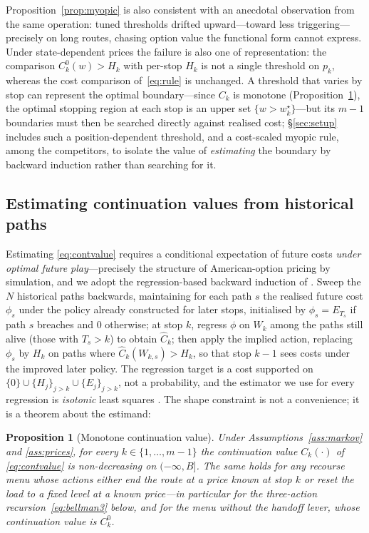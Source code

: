 \documentclass[preprint,authoryear,12pt]{elsarticle}
\newtheorem{proposition}[theorem]{Proposition}
\theoremstyle{definition}
\theoremstyle{remark}
\begin{document}
Proposition~\ref{prop:myopic} is also consistent with an anecdotal
observation from the same operation: tuned thresholds drifted upward---toward less triggering---precisely on long
routes, chasing option value the functional form cannot express. Under
state-dependent prices the failure is also one of representation: the
comparison $C^0_k(w) > H_k$ with per-stop $H_k$ is not a single
threshold on $p_k$, whereas the cost comparison of~\eqref{eq:rule} is
unchanged. A threshold that varies by stop can represent the optimal
boundary---since $C_k$ is monotone (Proposition~\ref{prop:monotone}),
the optimal stopping region at each stop is an upper set
$\{w > w^\star_k\}$---but its $m-1$ boundaries must then be searched
directly against realised cost; \S\ref{sec:setup} includes such a
position-dependent threshold, and a cost-scaled myopic rule, among the
competitors, to isolate the value of \emph{estimating} the boundary by
backward induction rather than searching for it.

\subsection{Estimating continuation values from historical paths}
\label{sec:estimation}

Estimating \eqref{eq:contvalue} requires a conditional expectation of
future costs \emph{under optimal future play}---precisely the structure
of American-option pricing by simulation, and we adopt the
regression-based backward induction of \citet{longstaff2001valuing}.
Sweep the $N$ historical paths backwards, maintaining for each path $s$
the realised future cost $\phi_s$ under the policy already constructed
for later stops, initialised by $\phi_s = E_{T_s}$ if path $s$ breaches
and $0$ otherwise; at stop $k$, regress $\phi$ on $W_k$ among the paths
still alive (those with $T_s > k$) to obtain $\widehat C_k$; then apply
the implied action, replacing $\phi_s$ by $H_k$ on paths where
$\widehat C_k(W_{k,s}) > H_k$, so that stop $k-1$ sees costs under the
improved later policy. The regression target is a cost supported on
$\{0\} \cup \{H_j\}_{j>k} \cup \{E_j\}_{j>k}$, not a probability, and
the estimator we use for every regression is \emph{isotonic} least
squares \citep{barlow1972statistical}. The shape constraint is not a
convenience; it is a theorem about the estimand:

\begin{proposition}[Monotone continuation value]\label{prop:monotone}
Under Assumptions~\ref{ass:markov} and \ref{ass:prices}, for every
$k \in \{1,\dots,m-1\}$ the continuation value $C_k(\cdot)$ of
\eqref{eq:contvalue} is non-decreasing on $(-\infty, B]$. The same holds
for any recourse menu whose actions either end the route at a price
known at stop $k$ or reset the load to a fixed level at a known
price---in particular for the three-action recursion~\eqref{eq:bellman3}
below, and for the menu without the handoff lever, whose continuation
value is $C^0_k$.
\end{proposition}
\end{document}
